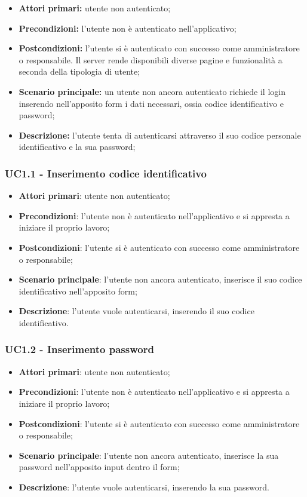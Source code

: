 \begin{itemize}
	\item 	\textbf{Attori primari:} utente non autenticato;
	\item 	\textbf{Precondizioni:} l'utente non è autenticato nell'applicativo;
	\item 	\textbf{Postcondizioni:}	l'utente si è autenticato con successo come amministratore o responsabile. Il server rende disponibili diverse pagine e funzionalità a seconda della tipologia di utente;
	\item 	\textbf{Scenario principale:} un utente non ancora autenticato richiede il login inserendo nell'apposito form i dati necessari, ossia codice identificativo e password;
	\item 	\textbf{Descrizione:} l'utente tenta di autenticarsi attraverso il suo codice personale identificativo e la sua password;
\end{itemize}

\subsubsection{UC1.1 - Inserimento codice identificativo}
\begin{itemize}
	\item \textbf{Attori primari}: utente non autenticato;
\item \textbf{Precondizioni}: l'utente non è autenticato nell'applicativo e si appresta a iniziare il proprio lavoro;
\item \textbf{Postcondizioni}: l'utente si è autenticato con successo come amministratore o responsabile;
\item \textbf{Scenario principale}: l'utente non ancora autenticato, inserisce il suo codice identificativo nell'apposito form;
\item \textbf{Descrizione}: l'utente vuole autenticarsi, inserendo il suo codice identificativo.
\end{itemize}

\subsubsection{UC1.2 - Inserimento password}
\begin{itemize}
\item \textbf{Attori primari}: utente non autenticato;
\item \textbf{Precondizioni}: l'utente non è autenticato nell'applicativo e si appresta a iniziare il proprio lavoro;
\item \textbf{Postcondizioni}: l'utente si è autenticato con successo come amministratore o responsabile;
\item \textbf{Scenario principale}: l'utente non ancora autenticato, inserisce la sua password nell'apposito input dentro il form;
\item \textbf{Descrizione}: l'utente vuole autenticarsi, inserendo la sua password.
\end{itemize}

